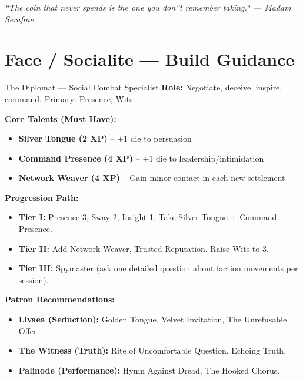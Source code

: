 \documentclass[10pt]{article}
\begin{document}
\vspace{0.5em}
\begin{center}
    {\small\sffamily\itshape ``The coin that never spends is the one you don''t remember taking.`` --- Madam Serafine}
\end{center}

\newpage


\section*{Face / Socialite --- Build Guidance}

\begin{tipbox}{The Diplomat --- Social Combat Specialist}
    \textbf{Role:} Negotiate, deceive, inspire, command. Primary: Presence, Wits.
    
    \textbf{Core Talents (Must Have):}
    \begin{itemize}
        \item \textbf{Silver Tongue (2 XP)} -- +1 die to persuasion
        \item \textbf{Command Presence (4 XP)} -- +1 die to leadership/intimidation
        \item \textbf{Network Weaver (4 XP)} -- Gain minor contact in each new settlement
    \end{itemize}
    
    \textbf{Progression Path:}
    \begin{itemize}
        \item \textbf{Tier I:} Presence 3, Sway 2, Insight 1. Take Silver Tongue + Command Presence.
        \item \textbf{Tier II:} Add Network Weaver, Trusted Reputation. Raise Wits to 3.
        \item \textbf{Tier III:} Spymaster (ask one detailed question about faction movements per session).
    \end{itemize}
    
    \textbf{Patron Recommendations:}
    \begin{itemize}
        \item \textbf{Livaea (Seduction):} Golden Tongue, Velvet Invitation, The Unrefusable Offer.
        \item \textbf{The Witness (Truth):} Rite of Uncomfortable Question, Echoing Truth.
        \item \textbf{Palinode (Performance):} Hymn Against Dread, The Hooked Chorus.
    \end{itemize}
\end{tipbox}
\end{document}
